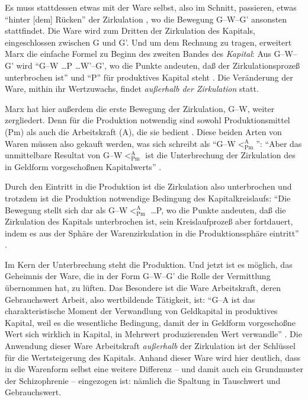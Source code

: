\documentclass[12pt,
               paper=a4,
               twoside=false,
               onehalfspacing,
               bibliography=totoc,
               toc=graduated,
               ]{scrartcl}
\newcommand{\pc}[2]{\parencite[#1]{#2}}
\newcommand{\vgl}[2]{\parencite[vgl.][#1]{#2}}
\newcommand{\gwg}{G--W--G'\xspace}
\newcommand{\gwapm}{G--W$<^{\text{A}}_{\text{Pm}}$\xspace}
\newcommand{\gwapmp}{G--W$<^{\text{A}}_{\text{Pm}}$ \dots P\xspace}
\begin{document}

Es muss stattdessen etwas mit der Ware selbst, also im Schnitt,
passieren, etwas "`hinter [dem] Rücken"' der Zirkulation
\pc{181}{kap}, wo die Bewegung \gwg ansonsten stattfindet. Die Ware
wird zum Dritten der Zirkulation des Kapitals, eingeschlossen zwischen
G und G'. Und um dem Rechnung zu tragen, erweitert Marx die einfache
Formel zu Beginn des zweiten Bandes des \emph{Kapital}: Aus \gwg wird
"`G--W \dots P \dots W'--G', wo die Punkte andeuten, daß der
Zirkulationsprozeß unterbrochen ist"' \pc{31}{kap2} und "`P"' für
produktives Kapital steht \vgl{34}{kap2}. Die Veränderung der Ware,
mithin ihr Wertzuwachs, findet \emph{außerhalb der Zirkulation} statt.


Marx hat hier außerdem die erste Bewegung der Zirkulation, G--W,
weiter zergliedert. Denn für die Produktion notwendig sind sowohl
Produktionsmittel (Pm) als auch die Arbeitskraft (A), die sie bedient
\vgl{32}{kap2}. Diese beiden Arten von Waren müssen also gekauft
werden, was sich schreibt als "`G--W$<^{\text{A}}_{\text{Pm}}$"':
"`Aber das unmittelbare Resultat von \gwapm ist die Unterbrechung der
Zirkulation des in Geldform vorgeschoßnen Kapitalwerts"'
\pc{40}{kap2}.

Durch den Eintritt in die Produktion ist die Zirkulation also
unterbrochen und trotzdem ist die Produktion notwendige Bedingung des
Kapitalkreislaufs: "`Die Bewegung stellt sich dar als \gwapmp, wo die
Punkte andeuten, daß die Zirkulation des Kapitals unterbrochen ist,
sein Kreislaufprozeß aber fortdauert, indem es aus der Sphäre der
Warenzirkulation in die Produktionssphäre eintritt"' \pc{40}{kap2}.


Im Kern der Unterbrechung steht die Produktion. Und jetzt ist es
möglich, das Geheimnis der Ware, die in der Form \gwg die Rolle der
Vermittlung übernommen hat, zu lüften. Das Besondere ist die Ware
Arbeitskraft, deren Gebrauchswert Arbeit, also wertbildende Tätigkeit,
ist: "`G--A ist das charakteristische Moment der Verwandlung von
Geldkapital in produktives Kapital, weil es die wesentliche Bedingung,
damit der in Geldform vorgeschoßne Wert sich wirklich in Kapital, in
Mehrwert produzierenden Wert verwandle"' \pc{35}{kap2}. Die Anwendung
dieser Ware Arbeitskraft \emph{außerhalb} der Zirkulation ist der
Schlüssel für die Wertsteigerung des Kapitals. Anhand dieser Ware wird
hier deutlich, dass in die Warenform selbst eine weitere Differenz --
und damit auch ein Grundmuster der Schizophrenie -- eingezogen ist:
nämlich die Spaltung in Tauschwert und Gebrauchswert.
\end{document}
